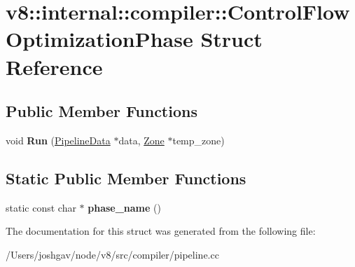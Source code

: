 \hypertarget{structv8_1_1internal_1_1compiler_1_1_control_flow_optimization_phase}{}\section{v8\+:\+:internal\+:\+:compiler\+:\+:Control\+Flow\+Optimization\+Phase Struct Reference}
\label{structv8_1_1internal_1_1compiler_1_1_control_flow_optimization_phase}
\subsection*{Public Member Functions}
\begin{DoxyCompactItemize}
\item 
void {\bfseries Run} (\hyperlink{classv8_1_1internal_1_1compiler_1_1_pipeline_data}{Pipeline\+Data} $\ast$data, \hyperlink{classv8_1_1internal_1_1_zone}{Zone} $\ast$temp\+\_\+zone)\hypertarget{structv8_1_1internal_1_1compiler_1_1_control_flow_optimization_phase_ae5a8379748dd956511246378cccc12cb}{}\label{structv8_1_1internal_1_1compiler_1_1_control_flow_optimization_phase_ae5a8379748dd956511246378cccc12cb}

\end{DoxyCompactItemize}
\subsection*{Static Public Member Functions}
\begin{DoxyCompactItemize}
\item 
static const char $\ast$ {\bfseries phase\+\_\+name} ()\hypertarget{structv8_1_1internal_1_1compiler_1_1_control_flow_optimization_phase_a1861ee2d2247c820104232d19eeeb4a1}{}\label{structv8_1_1internal_1_1compiler_1_1_control_flow_optimization_phase_a1861ee2d2247c820104232d19eeeb4a1}

\end{DoxyCompactItemize}


The documentation for this struct was generated from the following file\+:\begin{DoxyCompactItemize}
\item 
/\+Users/joshgav/node/v8/src/compiler/pipeline.\+cc\end{DoxyCompactItemize}
